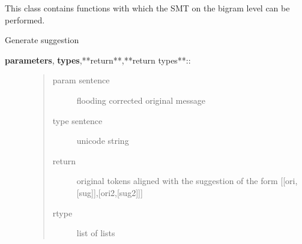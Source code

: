 \documentclass[letterpaper,10pt,english]{sphinxmanual}
\begin{document}
\begin{fulllineitems}
\label{API:norm.modules.smt.SMT_Bigram}
This class contains functions with which the SMT on the bigram level can be performed.

\begin{fulllineitems}
\label{API:norm.modules.smt.SMT_Bigram.generate_alternatives}
Generate suggestion
\begin{description}
\item[{\textbf{parameters}, \textbf{types},**return**,**return types**::}] \leavevmode\begin{quote}\begin{description}
\item[{param sentence}] \leavevmode
flooding corrected original message

\item[{type sentence}] \leavevmode
unicode string

\item[{return}] \leavevmode
original tokens aligned with the suggestion of the form {[}{[}ori,{[}sug{]}{]},{[}ori2,{[}sug2{]}{]}{]}

\item[{rtype}] \leavevmode
list of lists

\end{description}\end{quote}

\end{description}

\end{fulllineitems}


\end{fulllineitems}

\label{API:module-norm.modules.spellcheck}
\end{document}
